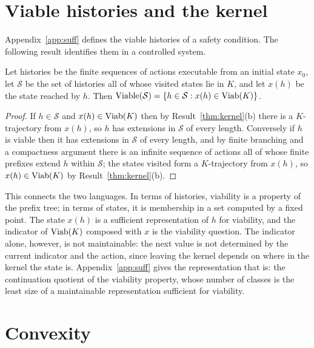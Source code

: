 \section{Viable histories and the kernel}

Appendix~\ref{app:suff} defines the viable histories of a safety condition. The following result identifies them in a controlled system.

\begin{newresult}\label{prop:viable-kernel}
Let histories be the finite sequences of actions executable from an initial state $x_0$, let $\mathcal S$ be the set of histories all of whose visited states lie in $K$, and let $x(h)$ be the state reached by $h$. Then $\operatorname{Viable}(\mathcal S)=\{h\in\mathcal S: x(h)\in\operatorname{Viab}(K)\}$.
\end{newresult}
\begin{proof}
If $h\in\mathcal S$ and $x(h)\in\operatorname{Viab}(K)$ then by Result~\ref{thm:kernel}(b) there is a $K$-trajectory from $x(h)$, so $h$ has extensions in $\mathcal S$ of every length. Conversely if $h$ is viable then it has extensions in $\mathcal S$ of every length, and by finite branching and a compactness argument there is an infinite sequence of actions all of whose finite prefixes extend $h$ within $\mathcal S$; the states visited form a $K$-trajectory from $x(h)$, so $x(h)\in\operatorname{Viab}(K)$ by Result~\ref{thm:kernel}(b).
\end{proof}

This connects the two languages. In terms of histories, viability is a property of the prefix tree; in terms of states, it is membership in a set computed by a fixed point. The state $x(h)$ is a sufficient representation of $h$ for viability, and the indicator of $\operatorname{Viab}(K)$ composed with $x$ is the viability question. The indicator alone, however, is not maintainable: the next value is not determined by the current indicator and the action, since leaving the kernel depends on where in the kernel the state is. Appendix~\ref{app:suff} gives the representation that is: the continuation quotient of the viability property, whose number of classes is the least size of a maintainable representation sufficient for viability.

\section{Convexity}

